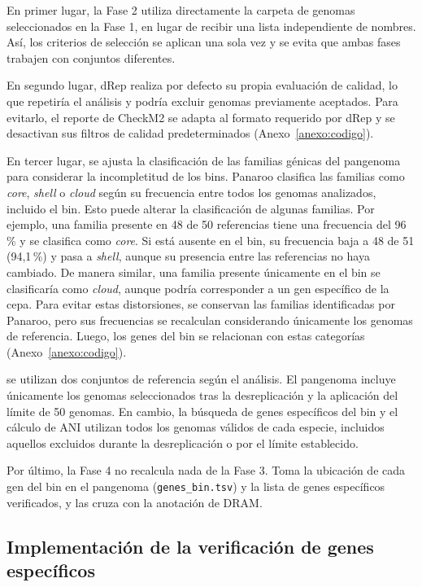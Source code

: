 En primer lugar, la Fase 2 utiliza directamente la carpeta de genomas seleccionados en la Fase 1,
en lugar de recibir una lista independiente de nombres. Así, los criterios de selección se aplican 
una sola vez y se evita que ambas fases trabajen con conjuntos diferentes.

En segundo lugar, dRep realiza por defecto su propia evaluación de calidad, lo que repetiría 
el análisis y podría excluir genomas previamente aceptados. Para evitarlo, el reporte de CheckM2
se adapta al formato requerido por dRep y se desactivan sus filtros de calidad predeterminados (Anexo~\ref{anexo:codigo}).

En tercer lugar, se ajusta la clasificación de las familias génicas del pangenoma para considerar
la incompletitud de los bins. Panaroo clasifica las familias como \textit{core}, \textit{shell} o
\textit{cloud} según su frecuencia entre todos los genomas analizados, incluido el bin. Esto
puede alterar la clasificación de algunas familias. Por ejemplo, una familia presente en 48 de 50
referencias tiene una frecuencia del 96\,\% y se clasifica como \textit{core}. Si está ausente en el bin,
su frecuencia baja a 48 de 51 (94,1\,\%) y pasa a \textit{shell}, aunque su presencia entre las referencias
no haya cambiado. De manera similar, una familia presente únicamente en el bin se clasificaría como \textit{cloud},
aunque podría corresponder a un gen específico de la cepa. Para evitar estas distorsiones, se conservan las familias
identificadas por Panaroo, pero sus frecuencias se recalculan considerando únicamente los genomas de referencia.
Luego, los genes del bin se relacionan con estas categorías (Anexo~\ref{anexo:codigo}).

 se utilizan dos conjuntos de referencia según el análisis. El pangenoma incluye únicamente los genomas
seleccionados tras la desreplicación y la aplicación del límite de 50 genomas. En cambio, la búsqueda de genes
específicos del bin y el cálculo de ANI utilizan todos los genomas válidos de cada especie, incluidos aquellos
excluidos durante la desreplicación o por el límite establecido.

\begin{nuevo}
Por último, la Fase 4 no recalcula nada de la Fase 3. Toma la ubicación de cada
gen del bin en el pangenoma (\texttt{genes\_bin.tsv}) y la lista de genes
específicos verificados, y las cruza con la anotación de DRAM.
\end{nuevo}

\subsection{Implementación de la verificación de genes específicos}
\label{subsec:impl_verificacion}

